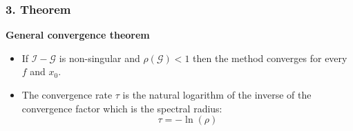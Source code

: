 \begin{frame}
	\frametitle{\textbf{3. Theorem}}

\begin{shaded}
	\textbf{General convergence theorem}
	\begin{itemize}
		\item If $\mathcal{I}-\mathcal{G}$ is non-singular and $\rho(\mathcal{G})<1$ then the method converges for every $f$ and $x_0$.
		\item The convergence rate $\tau$ is the natural logarithm of the inverse of the convergence factor which is the spectral radius:
		\[
		\tau = - \ln \left(\rho\right)
		\]
	\end{itemize}
	
		
\end{shaded}


		
	

\end{frame}
